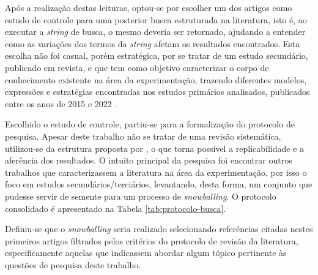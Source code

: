 \begin{table}[]
    \begin{center}
        
    \end{center}

\label{tab:conjunto-inicial}
\end{table}   

Após a realização destas leituras, optou-se por escolher um dos artigos como estudo de controle para uma posterior busca estruturada na literatura, isto é, ao executar a \textit{string} de busca, o mesmo deveria ser retornado, ajudando a entender como as variações dos termos da \textit{string} afetam os resultados encontrados. Esta escolha não foi casual, porém estratégica, por se tratar de um estudo secundário, publicado em revista, e que tem como objetivo caracterizar o corpo de conhecimento existente na área da experimentação, trazendo diferentes modelos, expressões e estratégias encontradas nos estudos primários analisados, publicados entre os anos de 2015 e 2022 \cite{erthal_characterization_2023}.


Escolhido o estudo de controle, partiu-se para a formalização do protocolo de pesquisa. Apesar deste trabalho não se tratar de uma revisão sistemática, utilizou-se da estrutura proposta por , o que torna possível a replicabilidade e a aferência dos resultados. O intuito principal da pesquisa foi encontrar outros trabalhos que caracterizassem a literatura na área da experimentação, por isso o foco em estudos secundários/terciários, levantando, desta forma, um conjunto que pudesse servir de semente para um processo de \textit{snowballing}.  O protocolo consolidado é apresentado na Tabela \ref{tab:protocolo-busca}.

Definiu-se que o \textit{snowballing} seria realizado selecionando referências citadas nestes primeiros artigos filtrados pelos critérios do protocolo de revisão da literatura, especificamente aquelas que indicassem abordar algum tópico pertinente às questões de pesquisa deste trabalho.


